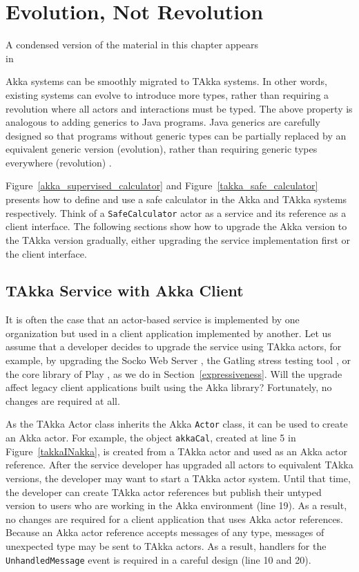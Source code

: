 \chapter{Evolution, Not Revolution }
\label{evolution}

\begin{center}
A condensed version of the material in this chapter appears \\ in~\citep[Section 5]{TAKKA_paper}
\end{center}
\vspace{12 pt}

Akka systems can be smoothly migrated to TAkka systems. In other words, 
existing systems can evolve to introduce more types, rather than requiring a 
revolution where all actors and interactions must be typed.
The above property is analogous to adding generics to Java programs.  Java 
generics are carefully designed so that programs without generic types can be 
partially replaced by an equivalent generic version (evolution), rather than 
requiring generic types everywhere (revolution) \citep{JGC}.

Figure~\ref{akka_supervised_calculator} and Figure~\ref{takka_safe_calculator} 
presents how to define and use a safe calculator
in the Akka and TAkka systems respectively.  Think of a {\tt SafeCalculator} actor
as a service and its reference as a client interface.  The following sections show how to upgrade
the Akka version to the TAkka version gradually, either upgrading the 
service implementation first or the client interface.


\section{TAkka Service with Akka Client}

It is often the case that an actor-based service is implemented by one 
organization but used in a client application implemented by another.  
Let us assume that a developer decides to upgrade the service 
using TAkka actors, for example, by upgrading the Socko Web Server 
\citep{SOCKO}, the Gatling stress testing tool \citep{Gatling}, or the core 
library of Play \citep{play_doc}, as we do in Section~\ref{expressiveness}.  
Will the upgrade affect legacy client applications
built using the Akka library?  Fortunately, no changes are required at all.

As the TAkka {Actor} class inherits the Akka {\tt Actor} class, it can be used 
to create an Akka actor.  For example, the object {\tt akkaCal}, created at line 
5 in Figure~\ref{takkaINakka}, is created from a TAkka actor and used as an Akka
actor reference.  After the service developer has upgraded all actors to equivalent 
TAkka versions, the developer may want to start a TAkka actor system.  Until that
time, the developer can create TAkka actor references but publish their untyped
version to users who are working in the Akka environment (line 19).
As a result, no changes are required for a client 
application that uses Akka actor references.  Because an Akka actor reference 
accepts messages of any type, messages of unexpected type may be sent to TAkka actors.  
As a result, handlers for the {\tt UnhandledMessage} event is required in a
careful design (line 10 and 20).


